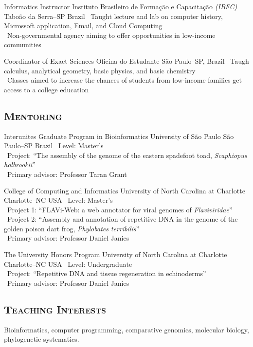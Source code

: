	{Informatics Instructor}
	{Instituto Brasileiro de Formação e Capacitação \emph{(IBFC)}}
	{Taboão da Serra--SP}
	{Brazil}
	{
		\textbullet~Taught lecture and lab  on computer history, Microssoft application, Email, and Cloud Computing\\
		\textbullet~Non-governmental agency aiming to offer opportunities in low-income communities
	}

\vspace{.5em}

	{Coordinator of Exact Sciences}
	{Oficina do Estudante}
	{São Paulo--SP, Brazil}
	{}
	{
		\textbullet~Taugh calculus, analytical geometry, basic physics, and basic chemistry\\
		\textbullet~Classes aimed to increase the chances of students from low-income families get access to a college education
	}

\vspace{.5em}
\subsection{\textsc{Mentoring}}
\vspace{.5em}

{Interunites Graduate Program in Bioinformatics}
{University of São Paulo}
{São Paulo--SP}
{Brazil}
{
	\textbullet~Level: Master's\\
	\textbullet~Project: ``The assembly of the genome of the eastern spadefoot toad, \emph{Scaphiopus holbrookii}''\\
	\textbullet~Primary advisor: Professor Taran Grant\\
}

\cventry{---}
{College of Computing and Informatics}
{University of North Carolina at Charlotte}
{Charlotte--NC}
{USA}
{
	\textbullet~Level: Master's\\
	\textbullet~Project 1: ``FLAVi-Web: a web annotator for viral genomes of \emph{Flaviviridae}''\\
	\textbullet~Project 2: ``Assembly and annotation of repetitive DNA in the genome of the golden poison dart frog, \emph{Phylobates terribilis}''\\
	\textbullet~Primary advisor: Professor Daniel Janies\\
}

\cventry{---}
{The University Honors Program}
{University of North Carolina at Charlotte}
{Charlotte--NC}
{USA}
{
	\textbullet~Level: Undergraduate\\
	\textbullet~Project: ``Repetitive DNA and tissue regeneration in echinoderms''\\
	\textbullet~Primary advisor: Professor Daniel Janies\\
}

\vspace{.5em}
	\subsection{\textsc{Teaching Interests}}
\vspace{.5em}

Bioinformatics, computer programming, comparative genomics, molecular biology, phylogenetic systematics.
